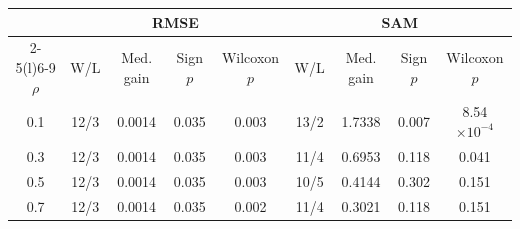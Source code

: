 \begin{tabular}{@{}c*{4}{c}*{4}{c}@{}}
\toprule
 & \multicolumn{4}{c}{RMSE} & \multicolumn{4}{c}{SAM} \\
\cmidrule(lr){2-5}\cmidrule(l){6-9}
$\rho$ & W/L & Med. gain & Sign $p$ & Wilcoxon $p$ & W/L & Med. gain & Sign $p$ & Wilcoxon $p$ \\
\midrule
0.1 & 12/3 & 0.0014 & 0.035 & 0.003 & 13/2 & 1.7338 & 0.007 & 8.54$\times 10^{-4}$ \\
0.3 & 12/3 & 0.0014 & 0.035 & 0.003 & 11/4 & 0.6953 & 0.118 & 0.041 \\
0.5 & 12/3 & 0.0014 & 0.035 & 0.003 & 10/5 & 0.4144 & 0.302 & 0.151 \\
0.7 & 12/3 & 0.0014 & 0.035 & 0.002 & 11/4 & 0.3021 & 0.118 & 0.151 \\
\bottomrule
\end{tabular}
